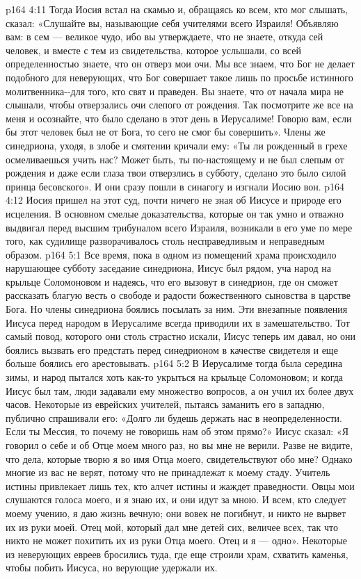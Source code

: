 \vs p164 4:11 Тогда Иосия встал на скамью и, обращаясь ко всем, кто мог слышать, сказал: «Слушайте вы, называющие себя учителями всего Израиля! Объявляю вам: в сем --- великое чудо, ибо вы утверждаете, что не знаете, откуда сей человек, и вместе с тем из свидетельства, которое услышали, со всей определенностью знаете, что он отверз мои очи. Мы все знаем, что Бог не делает подобного для неверующих, что Бог совершает такое лишь по просьбе истинного молитвенника\hyp{}\hyp{}для того, кто свят и праведен. Вы знаете, что от начала мира не слышали, чтобы отверзались очи слепого от рождения. Так посмотрите же все на меня и осознайте, что было сделано в этот день в Иерусалиме! Говорю вам, если бы этот человек был не от Бога, то сего не смог бы совершить». Члены же синедриона, уходя, в злобе и смятении кричали ему: «Ты ли рожденный в грехе осмеливаешься учить нас? Может быть, ты по\hyp{}настоящему и не был слепым от рождения и даже если глаза твои отверзлись в субботу, сделано это было силой принца бесовского». И они сразу пошли в синагогу и изгнали Иосию вон.
\vs p164 4:12 Иосия пришел на этот суд, почти ничего не зная об Иисусе и природе его исцеления. В основном смелые доказательства, которые он так умно и отважно выдвигал перед высшим трибуналом всего Израиля, возникали в его уме по мере того, как судилище разворачивалось столь несправедливым и неправедным образом.
\vs p164 5:1 Все время, пока в одном из помещений храма происходило нарушающее субботу заседание синедриона, Иисус был рядом, уча народ на крыльце Соломоновом и надеясь, что его вызовут в синедрион, где он сможет рассказать благую весть о свободе и радости божественного сыновства в царстве Бога. Но члены синедриона боялись посылать за ним. Эти внезапные появления Иисуса перед народом в Иерусалиме всегда приводили их в замешательство. Тот самый повод, которого они столь страстно искали, Иисус теперь им давал, но они боялись вызвать его предстать перед синедрионом в качестве свидетеля и еще больше боялись его арестовывать.
\vs p164 5:2 В Иерусалиме тогда была середина зимы, и народ пытался хоть как\hyp{}то укрыться на крыльце Соломоновом; и когда Иисус был там, люди задавали ему множество вопросов, а он учил их более двух часов. Некоторые из еврейских учителей, пытаясь заманить его в западню, публично спрашивали его: «Долго ли будешь держать нас в неопределенности. Если ты Мессия, то почему не говоришь нам об этом прямо?» Иисус сказал: «Я говорил о себе и об Отце моем много раз, но вы мне не верили. Разве не видите, что дела, которые творю я во имя Отца моего, свидетельствуют обо мне? Однако многие из вас не верят, потому что не принадлежат к моему стаду. Учитель истины привлекает лишь тех, кто алчет истины и жаждет праведности. Овцы мои слушаются голоса моего, и я знаю их, и они идут за мною. И всем, кто следует моему учению, я даю жизнь вечную; они вовек не погибнут, и никто не вырвет их из руки моей. Отец мой, который дал мне детей сих, величее всех, так что никто не может похитить их из руки Отца моего. Отец и я --- одно». Некоторые из неверующих евреев бросились туда, где еще строили храм, схватить каменья, чтобы побить Иисуса, но верующие удержали их.

